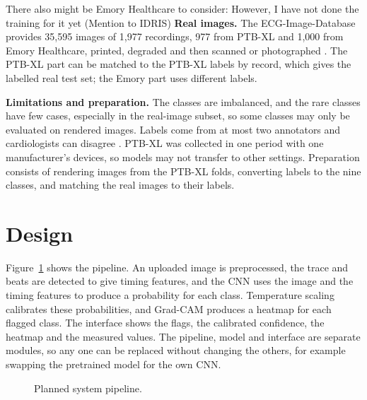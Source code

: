 There also might be Emory Healthcare to consider: However, I have not done the training for it yet (Mention to IDRIS)
\textbf{Real images.} The ECG-Image-Database provides 35,595 images of 1,977 recordings,
977 from PTB-XL and 1,000 from Emory Healthcare, printed, degraded and then scanned or
photographed \cite{reyna_ecg-image-database_2024}. The PTB-XL part can be matched to the
PTB-XL labels by record, which gives the labelled real test set; the Emory part uses
different labels.

\textbf{Limitations and preparation.} The classes are imbalanced, and the rare classes
have few cases, especially in the real-image subset, so some classes may only be evaluated
on rendered images. Labels come from at most two annotators \cite{wagner_ptbxl_2020} and
cardiologists can disagree \cite{dhutia_interrater_2017}. PTB-XL was collected in one period
with one manufacturer's devices, so models may not transfer to other settings. Preparation
consists of rendering images from the PTB-XL folds, converting labels to the nine classes,
and matching the real images to their labels.

\section{Design}
\label{sec:design}

Figure~\ref{fig:pipeline} shows the pipeline. An uploaded image is preprocessed, the trace
and beats are detected to give timing features, and the CNN uses the image and the timing
features to produce a probability for each class. Temperature scaling calibrates these
probabilities, and Grad-CAM produces a heatmap for each flagged class. The interface shows
the flags, the calibrated confidence, the heatmap and the measured values. The pipeline,
model and interface are separate modules, so any one can be replaced without changing the
others, for example swapping the pretrained model for the own CNN.

\begin{figure}[ht]
  \centering
  \caption{Planned system pipeline.}
  \label{fig:pipeline}
\end{figure}

